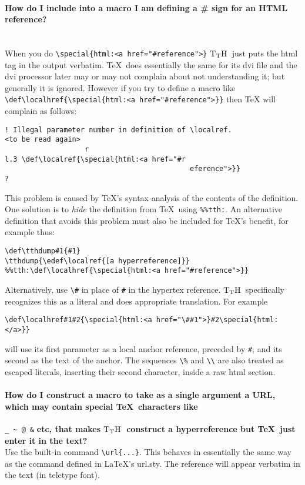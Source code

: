 \documentclass[12pt]{article}
\def\tthdump{}
\def\TtH{$\rm{}T_TH$}
\begin{document}
\paragraph{How do I include into a macro I am defining a \# sign
for an HTML reference?}\leavevmode\\
When you do \verb!\special{html:<a href="#reference">}! 
\TtH\ just puts the html tag in the output verbatim. \TeX\ does essentially the
same for its dvi file and the dvi processor later may or may not complain
about not understanding it; but generally it is ignored. However if you try
to define a macro like
\verb|\def\localhref{\special{html:<a href="#reference">}}| then \TeX
will complain as follows:\begin{verbatim}
! Illegal parameter number in definition of \localref.
<to be read again> 
                   r
l.3 \def\localref{\special{html:<a href="#r
                                            eference">}}
?\end{verbatim} This problem is caused by \TeX's syntax analysis of
the contents of the definition. One solution is to {\it hide} the
definition from \TeX\ using \verb|%%tth:|. An alternative definition
that avoids this problem must also be included for \TeX's benefit, for
example thus:\begin{verbatim}
\def\tthdump#1{#1}
\tthdump{\edef\localref{[a hyperreference]}}
%%tth:\def\localhref{\special{html:<a href="#reference">}}
\end{verbatim}
Alternatively, use \verb+\#+ in place of \verb+#+ in the hypertex
reference. \TtH\ specifically recognizes this as a literal and does
appropriate translation. For example
\begin{verbatim}
\def\localhref#1#2{\special{html:<a href="\##1">}#2\special{html:</a>}}
\end{verbatim}
will use its first parameter as a local anchor reference, preceded by \verb|#|,
and its second as the text of the anchor. The sequences \verb!\%! and
\verb!\\! are also treated as escaped literals, inserting their second
character, inside a raw html section.

\paragraph{How do I construct a macro to take as a single
argument a URL, which may contain special \TeX\ characters like} 
\verb|_ ~ @ &| 
\textbf{etc, that makes \TtH\ construct a hyperreference but \TeX\ just enter it in the
text?}\leavevmode\\ Use the built-in command \verb!\url{...}!. This behaves in
essentially the same way as the command defined in \LaTeX's
url.sty. The reference will appear verbatim in the text (in teletype
font).
\end{document}

